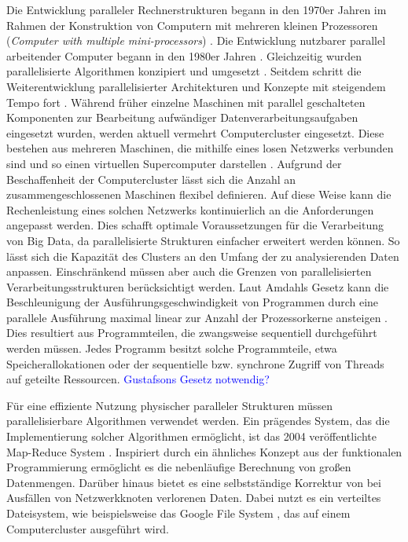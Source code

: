 Die Entwicklung paralleler Rechnerstrukturen begann in den 1970er Jahren im Rahmen der Konstruktion von Computern mit mehreren kleinen Prozessoren (\textit{Computer with multiple mini-processors}) \cite{Bell1971, Wulf1972}. Die Entwicklung nutzbarer parallel arbeitender Computer begann in den 1980er Jahren \cite{Seitz1985}. Gleichzeitig wurden parallelisierte Algorithmen konzipiert und umgesetzt \cite{Borodin1985}. Seitdem schritt die Weiterentwicklung parallelisierter Architekturen und Konzepte mit steigendem Tempo fort \cite{Trew2012}. Während früher einzelne Maschinen mit parallel geschalteten Komponenten zur Bearbeitung aufwändiger Datenverarbeitungsaufgaben eingesetzt wurden, werden aktuell vermehrt Computercluster eingesetzt. Diese bestehen aus mehreren Maschinen, die mithilfe eines losen Netzwerks verbunden sind und so einen virtuellen Supercomputer darstellen \cite{Hwang2013}. Aufgrund der Beschaffenheit der Computercluster lässt sich die Anzahl an zusammengeschlossenen Maschinen flexibel definieren. Auf diese Weise kann die Rechenleistung eines solchen Netzwerks kontinuierlich an die Anforderungen angepasst werden. Dies schafft optimale Voraussetzungen für die Verarbeitung von Big Data, da parallelisierte Strukturen einfacher erweitert werden können. So lässt sich die Kapazität des Clusters an den Umfang der zu analysierenden Daten anpassen. Einschränkend müssen aber auch die Grenzen von parallelisierten Verarbeitungsstrukturen berücksichtigt werden. Laut Amdahls Gesetz kann die Beschleunigung der Ausführungsgeschwindigkeit von Programmen durch eine parallele Ausführung maximal linear zur Anzahl der Prozessorkerne ansteigen \cite{Amdahl1967}. Dies resultiert aus Programmteilen, die zwangsweise sequentiell durchgeführt werden müssen. Jedes Programm besitzt solche Programmteile, etwa Speicherallokationen oder der sequentielle bzw. synchrone Zugriff von Threads auf geteilte Ressourcen. \textcolor{blue}{Gustafsons Gesetz notwendig?}  

Für eine effiziente Nutzung physischer paralleler Strukturen müssen parallelisierbare Algorithmen verwendet werden. Ein prägendes System, das die Implementierung solcher Algorithmen ermöglicht, ist das 2004 veröffentlichte Map-Reduce System \cite{Dean2004}. Inspiriert durch ein ähnliches Konzept aus der funktionalen Programmierung ermöglicht es die nebenläufige Berechnung von großen Datenmengen. Darüber hinaus bietet es eine selbstständige Korrektur von bei Ausfällen von Netzwerkknoten verlorenen Daten. Dabei nutzt es ein verteiltes Dateisystem, wie beispielsweise das Google File System \cite{Ghemawat2003}, das auf einem Computercluster ausgeführt wird.


